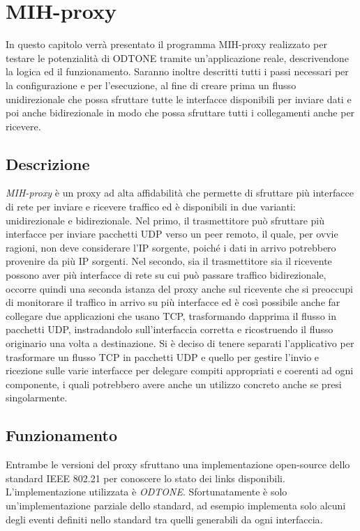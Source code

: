 \chapter{MIH-proxy}
In questo capitolo verrà presentato il programma MIH-proxy realizzato per testare le potenzialità di ODTONE tramite un'applicazione reale, descrivendone la logica ed il funzionamento. Saranno inoltre descritti tutti i passi necessari per la configurazione e per l'esecuzione, al fine di creare prima un flusso unidirezionale che possa sfruttare tutte le interfacce disponibili per inviare dati e poi anche bidirezionale in modo che possa sfruttare tutti i collegamenti anche per ricevere.

\section{Descrizione}
{\em MIH-proxy} è un proxy ad alta affidabilità che permette di sfruttare più interfacce di rete per inviare e ricevere traffico ed è disponibili in due varianti: unidirezionale e bidirezionale. Nel primo, il trasmettitore può sfruttare più interfacce per inviare pacchetti UDP verso un peer remoto, il quale, per ovvie ragioni, non deve considerare l'IP sorgente, poiché i dati in arrivo potrebbero provenire da più IP sorgenti. Nel secondo, sia il trasmettitore sia il ricevente possono aver più interfacce di rete su cui può passare traffico bidirezionale, occorre quindi una seconda istanza del proxy anche sul ricevente che si preoccupi di monitorare il traffico in arrivo su più interfacce ed è così possibile anche far collegare due applicazioni che usano TCP, trasformando dapprima il flusso in pacchetti UDP, instradandolo sull'interfaccia corretta e ricostruendo il flusso originario una volta a destinazione. Si è deciso di tenere separati l'applicativo per trasformare un flusso TCP in pacchetti UDP e quello per gestire l'invio e ricezione sulle varie interfacce per delegare compiti appropriati e coerenti ad ogni componente, i quali potrebbero avere anche un utilizzo concreto anche se presi singolarmente.

\section{Funzionamento}
Entrambe le versioni del proxy sfruttano una implementazione open-source dello standard IEEE 802.21 per conoscere lo stato dei links disponibili. L'implementazione utilizzata è {\em ODTONE}\cite{odtone}. Sfortunatamente è solo un'implementazione parziale dello standard, ad esempio implementa solo alcuni degli eventi definiti nello standard tra quelli generabili da ogni interfaccia.\\

